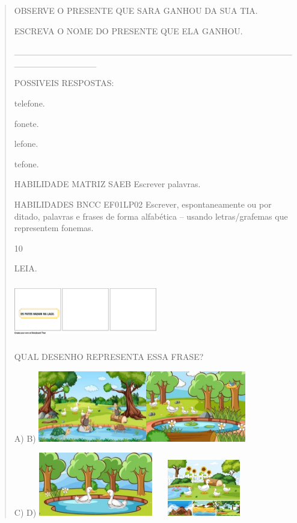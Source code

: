 \begin{escola}
{\begin{verse}
OBSERVE O PRESENTE QUE SARA GANHOU DA SUA TIA.

ESCREVA O NOME DO PRESENTE QUE ELA GANHOU.

\_\_\_\_\_\_\_\_\_\_\_\_\_\_\_\_\_\_\_\_\_\_\_\_\_\_\_\_\_\_\_\_\_\_\_\_\_\_\_\_\_\_\_\_\_\_\_\_\_\_\_\_\_\_\_\_\_

POSSIVEIS RESPOSTAS:

telefone.

fonete.

lefone.

tefone.

HABILIDADE MATRIZ SAEB Escrever palavras.

HABILIDADES BNCC EF01LP02 Escrever, espontaneamente ou por ditado,
palavras e frases de forma alfabética -- usando letras/grafemas que
representem fonemas.

\num{10}

LEIA.

\includegraphics[width=2.46358in,height=0.98459in]{media/image249.png}

QUAL DESENHO REPRESENTA ESSA FRASE?

A) B)
\includegraphics[width=1.85903in,height=1.21806in]{media/image250.jpg}\includegraphics[width=1.71806in,height=1.21875in]{media/image251.jpg}

C) D)
\includegraphics[width=1.96319in,height=1.09028in]{media/image252.jpg}\includegraphics[width=1.78681in,height=0.96806in]{media/image253.jpg}


\end{verse}}
\end{escola}
